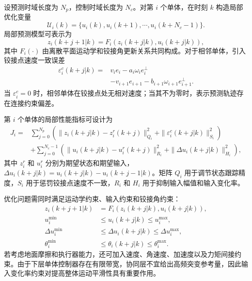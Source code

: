 \documentclass[type=bachelor]{bithesis}
\begin{document}
设预测时域长度为 $N_p$，控制时域长度为 $N_c$。对第 $i$ 个单体，在时刻 $k$ 构造局部优化变量
\begin{equation}
  \mathcal{U}_i(k)=\{u_i(k),u_i(k+1),\cdots,u_i(k+N_c-1)\}.
\end{equation}
局部预测模型可表示为
\begin{equation}
  z_i(k+j+1|k)=F_i(z_i(k+j|k),u_i(k+j|k)),
\end{equation}
其中 $F_i(\cdot)$ 由离散平面运动学和铰接角更新关系共同构成。对于相邻单体，引入铰接点速度一致误差
\begin{equation}
\begin{aligned}
  \varepsilon_i^c(k+j|k)=&
  v_i e_i-a_i\omega_i e_i^\perp\\
  &-v_{i+1}e_{i+1}-b_{i+1}\omega_{i+1}e_{i+1}^{\perp}.
\end{aligned}
\end{equation}
当 $\varepsilon_i^c=0$ 时，相邻单体在铰接点处无相对速度；当其不为零时，表示预测轨迹存在连接约束偏差。

第 $i$ 个单体的局部性能指标可设计为
\begin{equation}
\begin{aligned}
  J_i=&
  \sum_{j=0}^{N_p}
  \left(
  \|z_i(k+j|k)-z_i^r(k+j)\|_{Q_i}^2
  +\|\varepsilon_i^c(k+j|k)\|_{S_i}^2
  \right)\\
  &+
  \sum_{j=0}^{N_c-1}
  \left(
  \|u_i(k+j|k)-u_i^r(k+j)\|_{R_i}^2
  +\|\Delta u_i(k+j|k)\|_{H_i}^2
  \right),
\end{aligned}
\end{equation}
其中 $z_i^r$ 和 $u_i^r$ 分别为期望状态和期望输入，$\Delta u_i(k+j|k)=u_i(k+j|k)-u_i(k+j-1|k)$。矩阵 $Q_i$ 用于调节状态跟踪精度，$S_i$ 用于惩罚铰接点速度不一致，$R_i$ 和 $H_i$ 用于抑制输入幅值和输入变化率。

优化问题需同时满足运动学约束、输入约束和铰接角约束：
\begin{equation}
\begin{aligned}
  z_i(k+j+1|k)&=F_i(z_i(k+j|k),u_i(k+j|k)),\\
  u_i^{\min}&\le u_i(k+j|k)\le u_i^{\max},\\
  \Delta u_i^{\min}&\le \Delta u_i(k+j|k)\le \Delta u_i^{\max},\\
  \theta_i^{\min}&\le \theta_i(k+j|k)\le \theta_i^{\max}.
\end{aligned}
\end{equation}
若考虑地面摩擦和执行器能力，还可加入速度、角速度、加速度以及力矩间接约束。由于下层单体控制器存在有限带宽，协同层不宜给出高频突变参考量，因此输入变化率约束对提高整体运动平滑性具有重要作用。
\end{document}
